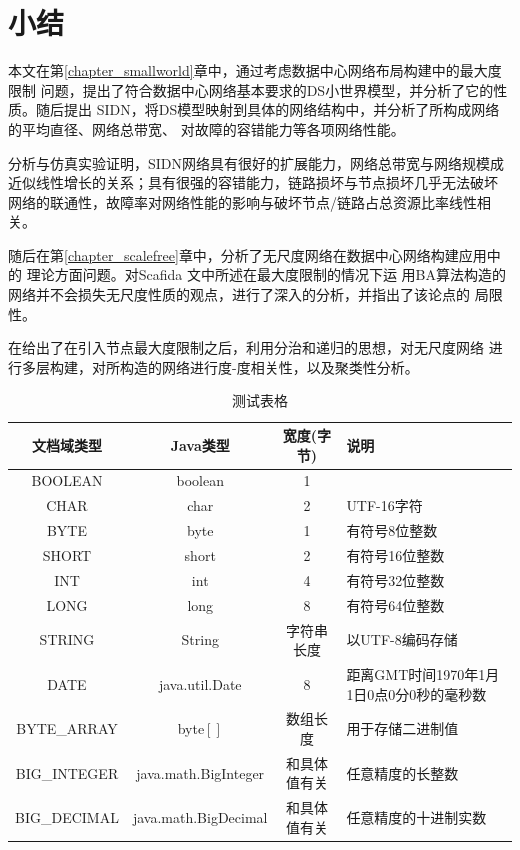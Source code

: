 \documentclass[phd,nobackinfo]{scutthesis}
\begin{document}
\section{小结}
\blindtext

\begin{conclusion}\label{chapter_concludes}

本文在第\ref{chapter_smallworld}章中，通过考虑数据中心网络布局构建中的最大度限制
问题，提出了符合数据中心网络基本要求的DS小世界模型，并分析了它的性质。随后提出
SIDN，将DS模型映射到具体的网络结构中，并分析了所构成网络的平均直径、网络总带宽、
对故障的容错能力等各项网络性能。

分析与仿真实验证明，SIDN网络具有很好的扩展能力，网络总带宽与网络规模成
近似线性增长的关系；具有很强的容错能力，链路损坏与节点损坏几乎无法破坏
网络的联通性，故障率对网络性能的影响与破坏节点/链路占总资源比率线性相关。

随后在第\ref{chapter_scalefree}章中，分析了无尺度网络在数据中心网络构建应用中的
理论方面问题。对Scafida \cite{gyarmati2010scafida}文中所述在最大度限制的情况下运
用BA算法构造的网络并不会损失无尺度性质的观点，进行了深入的分析，并指出了该论点的
局限性。

在给出了在引入节点最大度限制之后，利用分治和递归的思想，对无尺度网络
进行多层构建，对所构造的网络进行度-度相关性，以及聚类性分析。

\begin{table}
  \centering
  \begin{tabular}{cccp{38mm}}
    \toprule
    \textbf{文档域类型} & \textbf{Java类型} & \textbf{宽度(字节)} & \textbf{说明} \\
    \midrule
    BOOLEAN  & boolean &  1  & \\
    CHAR     & char    &  2  & UTF-16字符 \\
    BYTE     & byte    &  1  & 有符号8位整数 \\
    SHORT    & short   &  2  & 有符号16位整数 \\
    INT      & int     &  4  & 有符号32位整数 \\
    LONG     & long    &  8  & 有符号64位整数 \\
    STRING   & String  &  字符串长度  & 以UTF-8编码存储 \\
    DATE     & java.util.Date & 8 & 距离GMT时间1970年1月1日0点0分0秒的毫秒数 \\
    BYTE\_ARRAY & byte$[]$ & 数组长度 & 用于存储二进制值 \\
    BIG\_INTEGER & java.math.BigInteger & 和具体值有关 & 任意精度的长整数 \\
    BIG\_DECIMAL & java.math.BigDecimal & 和具体值有关 & 任意精度的十进制实数 \\
    \bottomrule
  \end{tabular}
  \caption{测试表格}\label{table:test5}
\end{table}


\end{conclusion}
\end{document}

